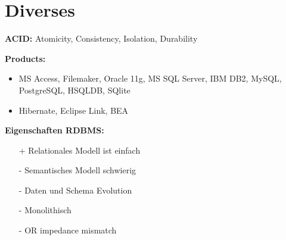 
\section{Diverses}

\begin{breakbox}
\textbf{ACID:}
\newline Atomicity, Consistency, Isolation, Durability
\end{breakbox}

\begin{breakbox}
\textbf{Products:}
\begin{itemize}
	\item MS Access, Filemaker, Oracle 11g, MS SQL Server, IBM DB2, MySQL, PostgreSQL, HSQLDB, SQlite
	\item Hibernate, Eclipse Link, BEA
\end{itemize}
\end{breakbox}

\begin{breakbox}
\textbf{Eigenschaften RDBMS:}
\begin{itemize}
	\item[+] Relationales Modell ist einfach
	\item[-] Semantisches Modell schwierig
	\item[-] Daten und Schema Evolution
	\item[-] Monolithisch
	\item[-] OR impedance mismatch
\end{itemize}
\end{breakbox}
